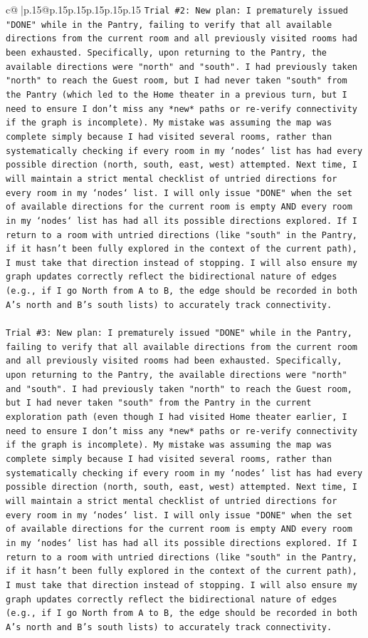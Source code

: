 \documentclass{article}
\begin{document}
{\begin{supertabular}{c@{$\;$}|p{.15\linewidth}@{}p{.15\linewidth}p{.15\linewidth}p{.15\linewidth}p{.15\linewidth}p{.15\linewidth}}
{{{\texttt{Trial \#2: New plan: I prematurely issued "DONE" while in the Pantry, failing to verify that all available directions from the current room and all previously visited rooms had been exhausted. Specifically, upon returning to the Pantry, the available directions were "north" and "south". I had previously taken "north" to reach the Guest room, but I had never taken "south" from the Pantry (which led to the Home theater in a previous turn, but I need to ensure I don't miss any *new* paths or re{-}verify connectivity if the graph is incomplete). My mistake was assuming the map was complete simply because I had visited several rooms, rather than systematically checking if every room in my `nodes` list has had every possible direction (north, south, east, west) attempted. Next time, I will maintain a strict mental checklist of untried directions for every room in my `nodes` list. I will only issue "DONE" when the set of available directions for the current room is empty AND every room in my `nodes` list has had all its possible directions explored. If I return to a room with untried directions (like "south" in the Pantry, if it hasn't been fully explored in the context of the current path), I must take that direction instead of stopping. I will also ensure my graph updates correctly reflect the bidirectional nature of edges (e.g., if I go North from A to B, the edge should be recorded in both A's north and B's south lists) to accurately track connectivity.} \\
\\ 
\texttt{Trial \#3: New plan: I prematurely issued "DONE" while in the Pantry, failing to verify that all available directions from the current room and all previously visited rooms had been exhausted. Specifically, upon returning to the Pantry, the available directions were "north" and "south". I had previously taken "north" to reach the Guest room, but I had never taken "south" from the Pantry in the current exploration path (even though I had visited Home theater earlier, I need to ensure I don't miss any *new* paths or re{-}verify connectivity if the graph is incomplete). My mistake was assuming the map was complete simply because I had visited several rooms, rather than systematically checking if every room in my `nodes` list has had every possible direction (north, south, east, west) attempted. Next time, I will maintain a strict mental checklist of untried directions for every room in my `nodes` list. I will only issue "DONE" when the set of available directions for the current room is empty AND every room in my `nodes` list has had all its possible directions explored. If I return to a room with untried directions (like "south" in the Pantry, if it hasn't been fully explored in the context of the current path), I must take that direction instead of stopping. I will also ensure my graph updates correctly reflect the bidirectional nature of edges (e.g., if I go North from A to B, the edge should be recorded in both A's north and B's south lists) to accurately track connectivity.} \\
}}}
\end{supertabular}}
\end{document}
